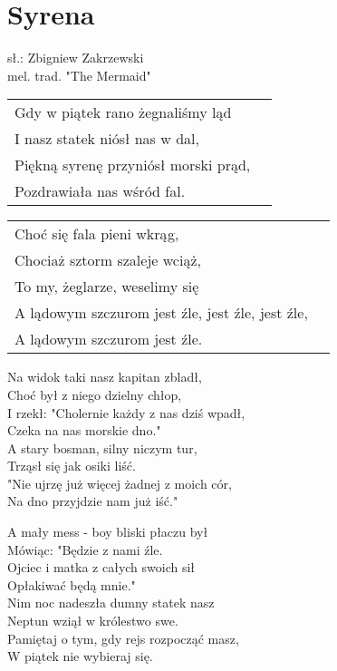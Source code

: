 \section{Syrena}

sł.: Zbigniew Zakrzewski\\
mel. trad. "The Mermaid"

\vspace{2em}
\begin{tabular}{@{}p{10cm}@{}l@{}}
Gdy w piątek rano żegnaliśmy ląd \\
I nasz statek niósł nas w dal, \\
Piękną syrenę przyniósł morski prąd, \\
Pozdrawiała nas wśród fal. \\
\end{tabular}

\begin{tabular}{@{}p{10cm}@{}l@{}}
Choć się fala pieni wkrąg, \\
Chociaż sztorm szaleje wciąż, \\
To my, żeglarze, weselimy się \\
A lądowym szczurom jest źle, jest źle, jest źle, \\
A lądowym szczurom jest źle. \\
\end{tabular}

\vspace{1em}
Na widok taki nasz kapitan zbladł, \\
Choć był z niego dzielny chłop, \\
I rzekł: "Cholernie każdy z nas dziś wpadł, \\
Czeka na nas morskie dno." \\

A stary bosman, silny niczym tur, \\
Trząsł się jak osiki liść. \\
"Nie ujrzę już więcej żadnej z moich cór, \\
Na dno przyjdzie nam już iść." \\

\begin{multicols}{2}
A mały mess - boy bliski płaczu był \\
Mówiąc: "Będzie z nami źle. \\
Ojciec i matka z całych swoich sił \\
Opłakiwać będą mnie." \\

Nim noc nadeszła dumny statek nasz \\
Neptun wziął w królestwo swe. \\
Pamiętaj o tym, gdy rejs rozpocząć masz, \\
W piątek nie wybieraj się.
\end{multicols}
